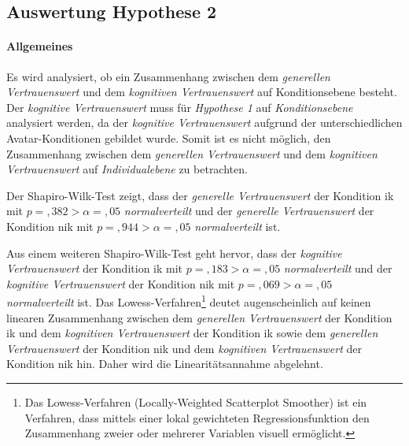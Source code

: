 \documentclass[a4paper,11pt]{article}%
\renewcommand{\\}{\vspace*{0.5\baselineskip} \newline}
\begin{document}
{\newpage
\subsection{Auswertung Hypothese 2}
\label{Auswertung Hypothese 2}

\paragraph{Allgemeines}
Es wird analysiert, ob ein Zusammenhang zwischen dem \textit{generellen Vertrauenswert} und dem \textit{kognitiven Vertrauenswert} auf Konditionsebene besteht.\\
Der \textit{kognitive Vertrauenswert} muss für \textit{Hypothese 1} auf \textit{Konditionsebene} analysiert werden, da der \textit{kognitive Vertrauenswert} aufgrund der unterschiedlichen Avatar-Konditionen gebildet wurde. Somit ist es nicht möglich, den Zusammenhang zwischen dem \textit{generellen Vertrauenswert} und dem \textit{kognitiven Vertrauenswert} auf \textit{Individualebene} zu betrachten.

Der Shapiro-Wilk-Test zeigt, dass der \textit{generelle Vertrauenswert} der Kondition \ac{ik} mit $p =,382 > \alpha =,05$ \textit{normalverteilt} und der \textit{generelle Vertrauenswert} der Kondition \newline \ac{nik} mit $p =,944 > \alpha =,05$ \textit{normalverteilt} ist.

Aus einem weiteren Shapiro-Wilk-Test geht hervor, dass der \textit{kognitive Vertrauenswert} der Kondition \ac{ik} mit  $p =,183 > \alpha = ,05$ \textit{normalverteilt} und der \textit{kognitive Vertrauenswert} der Kondition \ac{nik} mit $p =,069 > \alpha =,05$ \textit{normalverteilt} ist.
Das Lowess-Verfahren\footnote{Das Lowess-Verfahren (Locally-Weighted Scatterplot Smoother) ist ein Verfahren, dass mittels einer lokal gewichteten Regressionsfunktion den Zusammenhang zweier oder mehrerer Variablen visuell ermöglicht.} deutet augenscheinlich auf keinen linearen Zusammenhang zwischen dem \textit{generellen Vertrauenswert} der Kondition \ac{ik} und dem \textit{kognitiven Vertrauenswert} der Kondition \ac{ik} sowie dem \textit{generellen Vertrauenswert} der Kondition \ac{nik} und dem \textit{kognitiven Vertrauenswert} der Kondition \ac{nik} hin. Daher wird die Linearitätsannahme abgelehnt.

}
\end{document}
